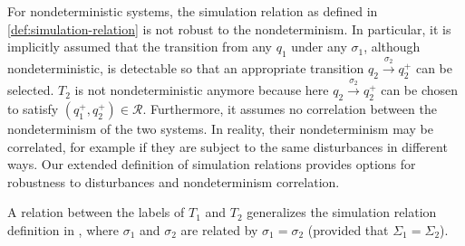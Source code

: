 \begin{remark}
  For nondeterministic systems, the simulation relation as defined in
  \cref{def:simulation-relation} is not robust to the
  nondeterminism. In particular, it is implicitly assumed that the transition
  from any $q_1$ under any $\sigma_1$, although nondeterministic, is
  detectable so that an appropriate transition $q_2 \xrightarrow{\sigma_2}
  q^+_2$ can be selected. $T_2$ is not nondeterministic anymore because here
  $q_2 \xrightarrow{\sigma_2} q^+_2$ can be chosen to satisfy $(q_1^+, q_2^+)
  \in \mathcal{R}$. Furthermore, it assumes no correlation between the
  nondeterminism of the two systems. In reality, their nondeterminism may be
  correlated, for example if they are subject to the same disturbances in
  different ways. Our extended definition of simulation relations provides
  options for robustness to disturbances and nondeterminism correlation.
\end{remark}

\begin{remark}
  A relation between the labels of $T_1$ and $T_2$ generalizes the simulation
  relation definition in {\cite{girardetal07amd}}, where $\sigma_1$ and
  $\sigma_2$ are related by $\sigma_1 = \sigma_2$ (provided that $\Sigma_1 =
  \Sigma_2$).
\end{remark}

